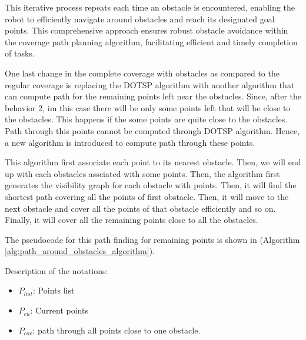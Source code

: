 \vspace*{6mm}  

This iterative process repeats each time an obstacle is encountered, enabling the robot to efficiently navigate around obstacles and reach its designated goal points. This comprehensive approach ensures robust obstacle avoidance within the coverage path planning algorithm, facilitating efficient and timely completion of tasks.

\vspace*{6mm}  

One last change in the complete coverage with obstacles as compared to the regular coverage is replacing the DOTSP algorithm with another algorithm that can compute path for the remaining points left near the obstacles. Since, after the behavior 2, im this case there will be only some points left that will be close to the obstacles. This happens if the some points are quite close to the obstacles. Path through this points cannot be computed through DOTSP algorithm. Hence, a new algorithm is introduced to compute path through these points. 

\vspace*{6mm}  


This algorithm first associate each point to its nearest obstacle. Then, we will end up with each obstacles assciated with some points. Then, the algorithm first generates the visibility graph for each obstacle with points. Then, it will find the shortest path covering all the points of first obstacle. Then, it will move to the next obstacle and cover all the points of that obstacle efficiently and so on. Finally, it will cover all the remaining points close to all the obstacles.


\vspace{6mm}  

The pseudocode for this path finding for remaining points is shown in (Algorithm \autoref{alg:path_around_obstacles_algorithm}). 


\vspace{6mm}  


Description of the notations:
\begin{itemize}[noitemsep,topsep=0pt]
    \item $P_{list}$: Points list
    \item $P_{cu}$: Current points
    \item $P_{cov}$: path through all points close to one obstacle.  
\end{itemize}

